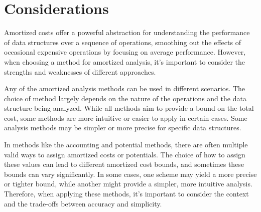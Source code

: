 \section{Considerations}

Amortized costs offer a powerful abstraction for understanding the performance of data structures over a sequence of operations, smoothing out the effects of occasional expensive operations by focusing on average performance.
However, when choosing a method for amortized analysis, it's important to consider the strengths and weaknesses of different approaches.

Any of the amortized analysis methods can be used in different scenarios. 
The choice of method largely depends on the nature of the operations and the data structure being analyzed.
While all methods aim to provide a bound on the total cost, some methods are more intuitive or easier to apply in certain cases.
Some analysis methods may be simpler or more precise for specific data structures.

In methods like the accounting and potential methods, there are often multiple valid ways to assign amortized costs or potentials. 
The choice of how to assign these values can lead to different amortized cost bounds, and sometimes these bounds can vary significantly. 
In some cases, one scheme may yield a more precise or tighter bound, while another might provide a simpler, more intuitive analysis. 
Therefore, when applying these methods, it's important to consider the context and the trade-offs between accuracy and simplicity.